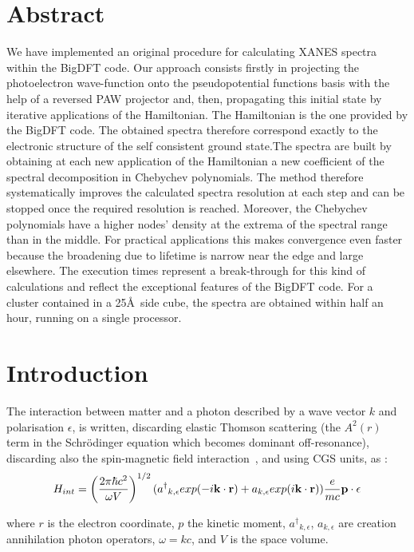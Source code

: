 \documentclass[a4paper,11pt]{report}
\begin{document}
\section{Abstract} 
We have implemented an original procedure for calculating XANES spectra within the BigDFT code. Our approach consists firstly in  projecting the photoelectron wave-function onto the pseudopotential functions basis with the help of a reversed PAW projector\cite{Taillefumier} and, then, propagating this initial state by iterative applications of the Hamiltonian. The Hamiltonian is the one provided by the BigDFT code. The obtained spectra therefore correspond exactly to the electronic structure of the self consistent ground state.The spectra are built by obtaining at each new application of the Hamiltonian a new coefficient of the spectral decomposition in Chebychev polynomials. The method therefore systematically improves the calculated spectra resolution at each step and can be stopped once the required resolution is reached. Moreover, the Chebychev polynomials have a higher nodes' density at the extrema of the spectral range  than in the middle. For practical applications this makes convergence even faster because the broadening due to lifetime is narrow near the edge and large elsewhere. The execution times represent a break-through for this kind of calculations and reflect the exceptional features of the BigDFT code. For a cluster contained in a 25\AA\ side cube, the spectra are obtained within half an hour, running on a single processor.


\section{Introduction}

The interaction between matter and a photon described by a wave vector ${ k}$ and polarisation ${ \epsilon}$,
  is written, discarding elastic Thomson scattering (the $ A^2(r)$ term in the Schr{\"o}dinger equation which becomes dominant off-resonance), discarding also the spin-magnetic field interaction~\cite{blume}, and using CGS units,  as :
\begin{equation}
H_{int} =
 \left( 
   \displaystyle \frac{2 \pi \hbar c^2 }{ \omega V}\right)^{1/2}
   ({  a^\dagger }_{ k,\epsilon} exp(-i {{\bf k} \cdot {\bf r}} ) 
    + a_{k ,\epsilon} exp(i { {\bf k} \cdot {\bf  r}} ))\frac{e}{ m c} {  {\bf p} \cdot  {\bf \epsilon} } \label{fondamentale}
\end{equation}

where ${ r}$ is the electron coordinate, ${ p}$ the kinetic moment, ${  a^\dagger }_{ k,\epsilon}$, $a_{ k ,\epsilon}$ 
are creation annihilation photon operators, $\omega= kc $, and $V$ is the space volume.
\end{document}

